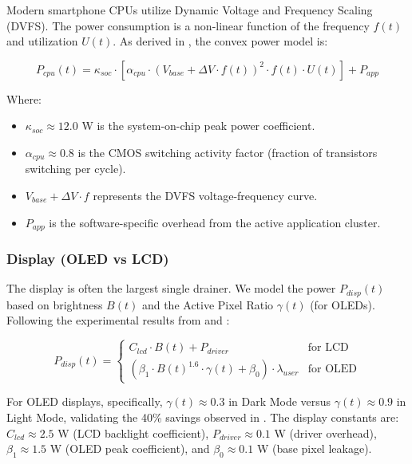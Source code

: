 \documentclass[12pt]{article}
\begin{document}
Modern smartphone CPUs utilize Dynamic Voltage and Frequency Scaling (DVFS). The power consumption is a non-linear function of the frequency $f(t)$ and utilization $U(t)$. As derived in \cite{1}, the convex power model is:

\begin{equation} \label{eq:cpu_power}
P_{cpu}(t) = \kappa_{soc} \cdot \left[ \alpha_{cpu} \cdot (V_{base} + \Delta V \cdot f(t))^2 \cdot f(t) \cdot U(t) \right] + P_{app}
\end{equation}

Where:
\begin{itemize}
    \item $\kappa_{soc} \approx 12.0$ W is the system-on-chip peak power coefficient.
    \item $\alpha_{cpu} \approx 0.8$ is the CMOS switching activity factor (fraction of transistors switching per cycle).
    \item $V_{base} + \Delta V \cdot f$ represents the DVFS voltage-frequency curve.
    \item $P_{app}$ is the software-specific overhead from the active application cluster.
\end{itemize}

\subsubsection{Display (OLED vs LCD)}

The display is often the largest single drainer. We model the power $P_{disp}(t)$ based on brightness $B(t)$ and the Active Pixel Ratio $\gamma(t)$ (for OLEDs). Following the experimental results from \cite{2} and \cite{5}:

\begin{equation} \label{eq:display_power}
P_{disp}(t) = \begin{cases} 
C_{lcd} \cdot B(t) + P_{driver} & \text{for LCD} \\
(\beta_{1} \cdot B(t)^{1.6} \cdot \gamma(t) + \beta_{0}) \cdot \lambda_{user} & \text{for OLED}
\end{cases}
\end{equation}

For OLED displays, specifically, $\gamma(t) \approx 0.3$ in Dark Mode versus $\gamma(t) \approx 0.9$ in Light Mode, validating the 40\% savings observed in \cite{5}. The display constants are: $C_{lcd} \approx 2.5$ W (LCD backlight coefficient), $P_{driver} \approx 0.1$ W (driver overhead), $\beta_1 \approx 1.5$ W (OLED peak coefficient), and $\beta_0 \approx 0.1$ W (base pixel leakage).
\end{document}
